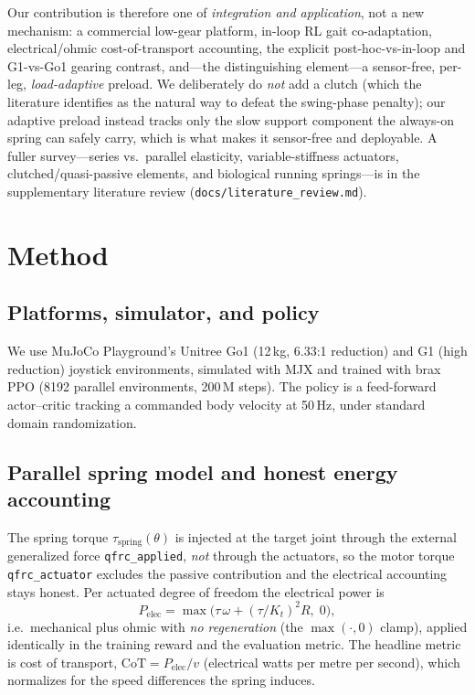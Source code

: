\documentclass[journal]{IEEEtran}
\begin{document}
Our contribution is therefore one of \emph{integration and application}, not a new mechanism: a commercial
low-gear platform, in-loop RL gait co-adaptation, electrical/ohmic cost-of-transport accounting, the explicit
post-hoc-vs-in-loop and G1-vs-Go1 gearing contrast, and---the distinguishing element---a sensor-free, per-leg,
\emph{load-adaptive} preload. We deliberately do \emph{not} add a clutch (which the literature identifies as the
natural way to defeat the swing-phase penalty); our adaptive preload instead tracks only the slow support
component the always-on spring can safely carry, which is what makes it sensor-free and deployable. A fuller
survey---series vs.\ parallel elasticity, variable-stiffness actuators, clutched/quasi-passive elements, and
biological running springs---is in the supplementary literature review (\texttt{docs/literature\_review.md}).

\section{Method}
\subsection{Platforms, simulator, and policy}
We use MuJoCo Playground's Unitree Go1 (12\,kg, 6.33:1 reduction) and G1 (high reduction) joystick environments,
simulated with MJX and trained with brax PPO (8192 parallel environments, 200\,M steps). The policy is a
feed-forward actor--critic tracking a commanded body velocity at 50\,Hz, under standard domain randomization.

\subsection{Parallel spring model and honest energy accounting}
The spring torque $\tau_{\mathrm{spring}}(\theta)$ is injected at the target joint through the external
generalized force \texttt{qfrc\_applied}, \emph{not} through the actuators, so the motor torque
\texttt{qfrc\_actuator} excludes the passive contribution and the electrical accounting stays honest. Per
actuated degree of freedom the electrical power is
\begin{equation}
P_{\mathrm{elec}} = \max\!\big(\tau\,\omega + (\tau/K_t)^2 R,\; 0\big),
\end{equation}
i.e.\ mechanical plus ohmic with \emph{no regeneration} (the $\max(\cdot,0)$ clamp), applied identically in the
training reward and the evaluation metric. The headline metric is cost of transport, $\mathrm{CoT} =
P_{\mathrm{elec}}/v$ (electrical watts per metre per second), which normalizes for the speed differences the
spring induces.
\end{document}
